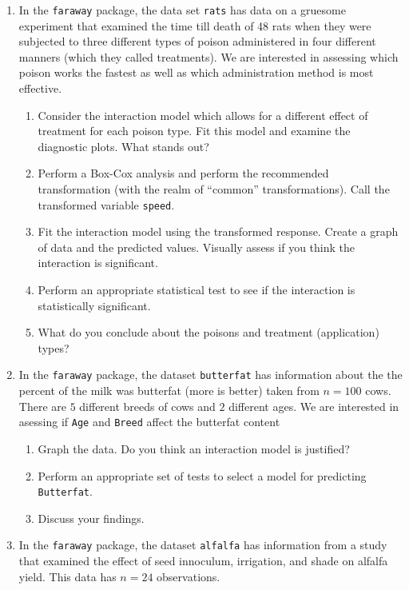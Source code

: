 \documentclass[]{book}
\providecommand{\tightlist}{%
  \setlength{\itemsep}{0pt}\setlength{\parskip}{0pt}}
\theoremstyle{definition}
\theoremstyle{definition}
\theoremstyle{remark}
\begin{document}
\begin{enumerate}
\def\labelenumi{\arabic{enumi}.}
\tightlist
\item
  In the \texttt{faraway} package, the data set \texttt{rats} has data
  on a gruesome experiment that examined the time till death of 48 rats
  when they were subjected to three different types of poison
  administered in four different manners (which they called treatments).
  We are interested in assessing which poison works the fastest as well
  as which administration method is most effective.

  \begin{enumerate}
  \def\labelenumii{\alph{enumii}.}
  \tightlist
  \item
    Consider the interaction model which allows for a different effect
    of treatment for each poison type. Fit this model and examine the
    diagnostic plots. What stands out?
  \item
    Perform a Box-Cox analysis and perform the recommended
    transformation (with the realm of ``common'' transformations). Call
    the transformed variable \texttt{speed}.
  \item
    Fit the interaction model using the transformed response. Create a
    graph of data and the predicted values. Visually assess if you think
    the interaction is significant.
  \item
    Perform an appropriate statistical test to see if the interaction is
    statistically significant.
  \item
    What do you conclude about the poisons and treatment (application)
    types?
  \end{enumerate}
\item
  In the \texttt{faraway} package, the dataset \texttt{butterfat} has
  information about the the percent of the milk was butterfat (more is
  better) taken from \(n=100\) cows. There are \(5\) different breeds of
  cows and \(2\) different ages. We are interested in asessing if
  \texttt{Age} and \texttt{Breed} affect the butterfat content

  \begin{enumerate}
  \def\labelenumii{\alph{enumii}.}
  \tightlist
  \item
    Graph the data. Do you think an interaction model is justified?
  \item
    Perform an appropriate set of tests to select a model for predicting
    \texttt{Butterfat}.
  \item
    Discuss your findings.
  \end{enumerate}
\item
  In the \texttt{faraway} package, the dataset \texttt{alfalfa} has
  information from a study that examined the effect of seed innoculum,
  irrigation, and shade on alfalfa yield. This data has \(n=24\)
  observations.


\end{enumerate}
\end{document}
